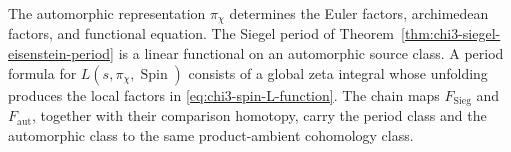 \begin{remark}
\label{rem:chi3-L-versus-period}
The automorphic representation \(\pi_\chi\) determines the Euler
factors, archimedean factors, and functional equation.  The Siegel
period of Theorem~\ref{thm:chi3-siegel-eisenstein-period} is a linear
functional on an automorphic source class.  A period formula for
\(L(s,\pi_\chi,\operatorname{Spin})\) consists of a global zeta
integral whose unfolding produces the local factors in
\eqref{eq:chi3-spin-L-function}.  The chain maps
\(F_{\mathrm{Sieg}}\) and \(F_{\mathrm{aut}}\), together with their
comparison homotopy, carry the period class and the automorphic class
to the same product-ambient cohomology class.
\end{remark}

\providecommand{\CYdim}{\mathrm{CYdim}}

